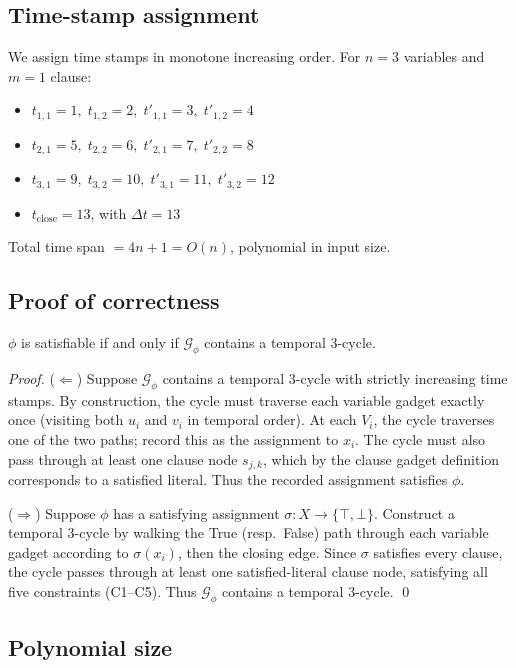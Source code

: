 \documentclass[journal,onecolumn]{IEEEtran}
\newcommand{\G}{\mathcal{G}}
\begin{document}
\subsection{Time-stamp assignment}

We assign time stamps in monotone increasing order. For $n = 3$ variables
and $m = 1$ clause:
\begin{itemize}
\item $t_{1,1} = 1, \; t_{1,2} = 2, \; t'_{1,1} = 3, \; t'_{1,2} = 4$
\item $t_{2,1} = 5, \; t_{2,2} = 6, \; t'_{2,1} = 7, \; t'_{2,2} = 8$
\item $t_{3,1} = 9, \; t_{3,2} = 10, \; t'_{3,1} = 11, \; t'_{3,2} = 12$
\item $t_{\mathrm{close}} = 13$, with $\Delta t = 13$
\end{itemize}
Total time span $= 4n + 1 = O(n)$, polynomial in input size.

\subsection{Proof of correctness}

\begin{theorem}
$\phi$ is satisfiable if and only if $\G_\phi$ contains a temporal
$3$-cycle.
\end{theorem}

\begin{proof}
($\Leftarrow$) Suppose $\G_\phi$ contains a temporal 3-cycle with
strictly increasing time stamps. By construction, the cycle must
traverse each variable gadget exactly once (visiting both $u_i$ and
$v_i$ in temporal order). At each $V_i$, the cycle traverses one of the
two paths; record this as the assignment to $x_i$. The cycle must also
pass through at least one clause node $s_{j,k}$, which by the clause
gadget definition corresponds to a satisfied literal. Thus the recorded
assignment satisfies $\phi$.

($\Rightarrow$) Suppose $\phi$ has a satisfying assignment $\sigma: X \to
\{\top, \bot\}$. Construct a temporal 3-cycle by walking the True
(resp.\ False) path through each variable gadget according to
$\sigma(x_i)$, then the closing edge. Since $\sigma$ satisfies every
clause, the cycle passes through at least one satisfied-literal clause
node, satisfying all five constraints (C1--C5). Thus $\G_\phi$ contains
a temporal 3-cycle. \qed
\end{proof}

\subsection{Polynomial size}
\end{document}
